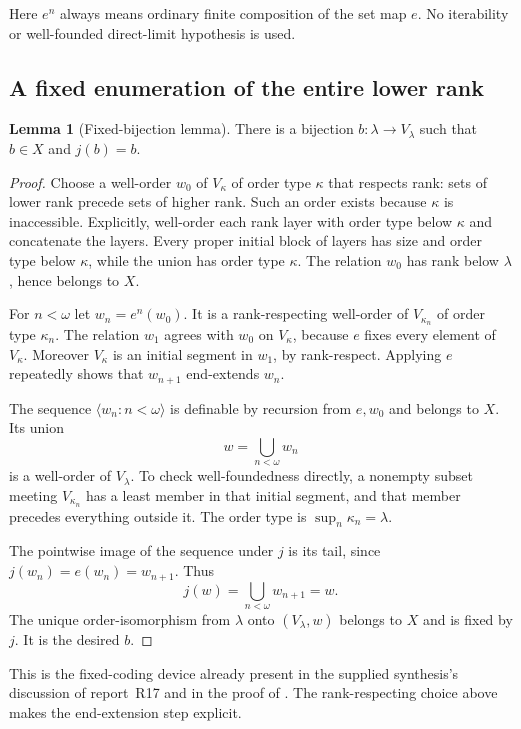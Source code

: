 \documentclass[11pt,letterpaper]{article}
\theoremstyle{definition}
\newtheorem{lemma}[definition]{Lemma}
\newcommand{\seq}[1]{\langle #1\rangle}
\begin{document}
Here $e^n$ always means ordinary finite composition of the set map $e$. No iterability or well-founded direct-limit hypothesis is used.

\subsection{A fixed enumeration of the entire lower rank}

\begin{lemma}[Fixed-bijection lemma]\label{lem:bijection}
There is a bijection $b:\lambda\to V_\lambda$ such that $b\in X$ and $j(b)=b$.
\end{lemma}

\begin{proof}
Choose a well-order $w_0$ of $V_\kappa$ of order type $\kappa$ that respects rank: sets of lower rank precede sets of higher rank. Such an order exists because $\kappa$ is inaccessible. Explicitly, well-order each rank layer with order type below $\kappa$ and concatenate the layers. Every proper initial block of layers has size and order type below $\kappa$, while the union has order type $\kappa$. The relation $w_0$ has rank below $\lambda$, hence belongs to $X$.

For $n<\omega$ let $w_n=e^n(w_0)$. It is a rank-respecting well-order of $V_{\kappa_n}$ of order type $\kappa_n$. The relation $w_1$ agrees with $w_0$ on $V_\kappa$, because $e$ fixes every element of $V_\kappa$. Moreover $V_\kappa$ is an initial segment in $w_1$, by rank-respect. Applying $e$ repeatedly shows that $w_{n+1}$ end-extends $w_n$.

The sequence $\seq{w_n:n<\omega}$ is definable by recursion from $e,w_0$ and belongs to $X$. Its union
\[
                               w=\bigcup_{n<\omega}w_n
\]
is a well-order of $V_\lambda$. To check well-foundedness directly, a nonempty subset meeting $V_{\kappa_n}$ has a least member in that initial segment, and that member precedes everything outside it. The order type is $\sup_n\kappa_n=\lambda$.

The pointwise image of the sequence under $j$ is its tail, since $j(w_n)=e(w_n)=w_{n+1}$. Thus
\[
                       j(w)=\bigcup_{n<\omega}w_{n+1}=w.
\]
The unique order-isomorphism from $\lambda$ onto $(V_\lambda,w)$ belongs to $X$ and is fixed by $j$. It is the desired $b$.
\end{proof}

This is the fixed-coding device already present in the supplied synthesis's discussion of report~R17 and in the proof of \cite[Proposition~3.9]{abgl}. The rank-respecting choice above makes the end-extension step explicit.
\end{document}
